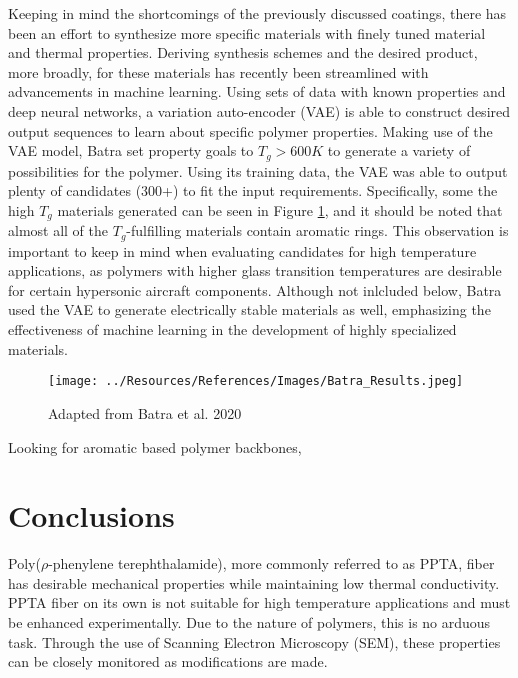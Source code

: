 \documentclass[12pt]{article}
\begin{document}
\indent Keeping in mind the shortcomings of the previously discussed coatings, there has been an effort to synthesize more specific materials with finely tuned material and thermal properties. Deriving synthesis schemes and the desired product, more broadly, for these materials has recently been streamlined with advancements in machine learning. Using sets of data with known properties and deep neural networks, a variation auto-encoder (VAE) is able to construct desired output sequences to learn about specific polymer properties. \citep{Batra2020} Making use of the VAE model, Batra set property goals to $T_g>600K$ to generate a variety of possibilities for the polymer. Using its training data, the VAE was able to output plenty of candidates (300+) to fit the input requirements. Specifically, some the high $T_g$ materials generated can be seen in Figure \ref{fig:Batra_Results}, and it should be noted that almost all of the $T_g$-fulfilling materials contain aromatic rings. This observation is important to keep in mind when evaluating candidates for high temperature applications, as polymers with higher glass transition temperatures are desirable for certain hypersonic aircraft components. Although not inlcluded below, Batra used the VAE to generate electrically stable materials as well, emphasizing the effectiveness of machine learning in the development of highly specialized materials.

\begin{figure}[h]
    \centering
    \texttt{[image: ../Resources/References/Images/Batra\_Results.jpeg]}
    \caption{\scriptsize{Adapted from Batra et al. 2020 \citep{Batra2020}}}
    \label{fig:Batra_Results}
\end{figure}

\indent Looking for aromatic based polymer backbones,  

\section{Conclusions}

\indent Poly($\rho$-phenylene terephthalamide), more commonly referred to as PPTA, fiber has desirable mechanical properties while maintaining low thermal conductivity.\citep{LiTong2022} PPTA fiber on its own is not suitable for high temperature applications and must be enhanced experimentally. Due to the nature of polymers, this is no arduous task. Through the use of Scanning Electron Microscopy (SEM), these properties can be closely monitored as modifications are made. 
\end{document}
